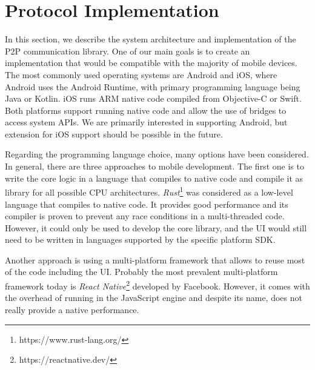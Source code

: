 
\chapter{Protocol Implementation}
\label{implementation}

In this section, we describe the system architecture and implementation of the P2P communication library. One of our main goals is to create an implementation that would be compatible with the majority of mobile devices. The most commonly used operating systems are Android and iOS, where Android uses the Android Runtime, with primary programming language being Java or Kotlin. iOS runs ARM native code compiled from Objective-C or Swift. Both platforms support running native code and allow the use of bridges to access system APIs. We are primarily interested in supporting Android, but extension for iOS support should be possible in the future.

Regarding the programming language choice, many options have been considered. In general, there are three approaches to mobile development. The first one is to write the core logic in a language that compiles to native code and compile it as library for all possible CPU architectures. \textit{Rust}\footnote{https://www.rust-lang.org/} was considered as a low-level language that compiles to native code. It provides good performance and its compiler is proven to prevent any race conditions in a multi-threaded code. However, it could only be used to develop the core library, and the UI would still need to be written in languages supported by the specific platform SDK.

Another approach is using a multi-platform framework that allows to reuse most of the code including the UI. Probably the most prevalent multi-platform framework today is \textit{React Native}\footnote{https://reactnative.dev/} developed by Facebook. However, it comes with the overhead of running in the JavaScript engine and despite its name, does not really provide a native performance.

